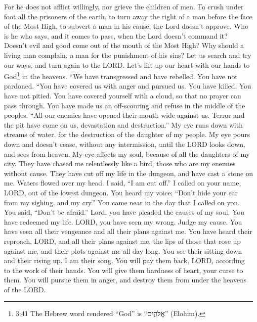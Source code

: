 For he does not afflict willingly, nor grieve the children
of men.  To crush under foot all the prisoners of the
earth,  to turn away the right of a man before the face of
the Most High,  to subvert a man in his cause, the Lord
doesn't approve.  Who is he who says, and it comes to pass,
when the Lord doesn't command it?  Doesn't evil and good
come out of the mouth of the Most High?  Why should a
living man complain, a man for the punishment of his sins? 
Let us search and try our ways, and turn again to the LORD.
 Let's lift up our heart with our hands to God\footnote{3:41
  The Hebrew word rendered ``God'' is ``אֱלֹהִ֑ים'' (Elohim).} in the
heavens.  ``We have transgressed and have rebelled. You
have not pardoned.  ``You have covered us with anger and
pursued us. You have killed. You have not pitied.  You have
covered yourself with a cloud, so that no prayer can pass through.
 You have made us an off-scouring and refuse in the middle
of the peoples.  ``All our enemies have opened their mouth
wide against us.  Terror and the pit have come on us,
devastation and destruction.''  My eye runs down with
streams of water, for the destruction of the daughter of my people.
 My eye pours down and doesn't cease, without any
intermission,  until the LORD looks down, and sees from
heaven.  My eye affects my soul, because of all the
daughters of my city.  They have chased me relentlessly
like a bird, those who are my enemies without cause.  They
have cut off my life in the dungeon, and have cast a stone on me.
 Waters flowed over my head. I said, ``I am cut off.''
 I called on your name, LORD, out of the lowest dungeon.
 You heard my voice: ``Don't hide your ear from my sighing,
and my cry.''  You came near in the day that I called on
you. You said, ``Don't be afraid.''  Lord, you have pleaded
the causes of my soul. You have redeemed my life.  LORD,
you have seen my wrong. Judge my cause.  You have seen all
their vengeance and all their plans against me.  You have
heard their reproach, LORD, and all their plans against me,
 the lips of those that rose up against me, and their plots
against me all day long.  You see their sitting down and
their rising up. I am their song.  You will pay them back,
LORD, according to the work of their hands.  You will give
them hardness of heart, your curse to them.  You will
pursue them in anger, and destroy them from under the heavens of the
LORD.

